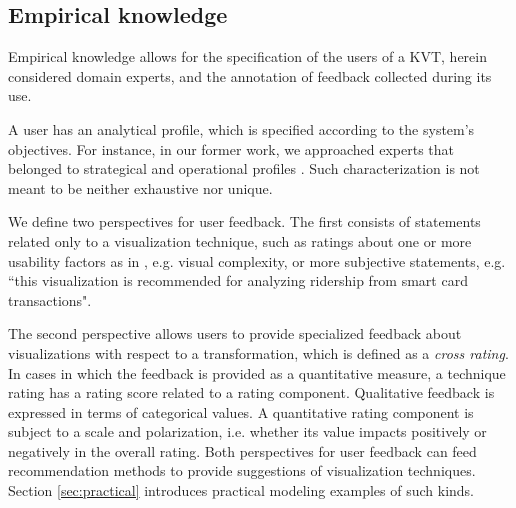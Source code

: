 \documentclass[]{interact}
\theoremstyle{plain}%
\theoremstyle{definition}
\theoremstyle{remark}
\theoremstyle{definition}
\begin{document}
%

\subsection{Empirical knowledge}
\label{sec:empiricalknowledge}

Empirical knowledge allows for the specification of the users of a KVT, herein considered domain experts, and the annotation of feedback collected during its use.

A user has an analytical profile, which is specified according to the system's objectives. For instance, in our former work, we approached experts that belonged to strategical and operational profiles \citep{Sobral2017}. Such characterization is not meant to be neither exhaustive nor unique.

We define two perspectives for user feedback. The first consists of statements related only to a visualization technique, such as ratings about one or more usability factors as in \cite{Aigner2011}, e.g. visual complexity, or more subjective statements, e.g. ``this visualization is recommended for analyzing ridership from smart card transactions".

The second perspective allows users to provide specialized feedback about visualizations with respect to a transformation, which is defined as a \emph{cross rating}. In cases in which the feedback is provided as a quantitative measure, a technique rating has a rating score related to a rating component. Qualitative feedback is expressed in terms of categorical values. A quantitative rating component is subject to a scale and polarization, i.e. whether its value impacts positively or negatively in the overall rating. Both perspectives for user feedback can feed recommendation methods to provide suggestions of visualization techniques. Section \ref{sec:practical} introduces practical modeling examples of such kinds.
\end{document}
